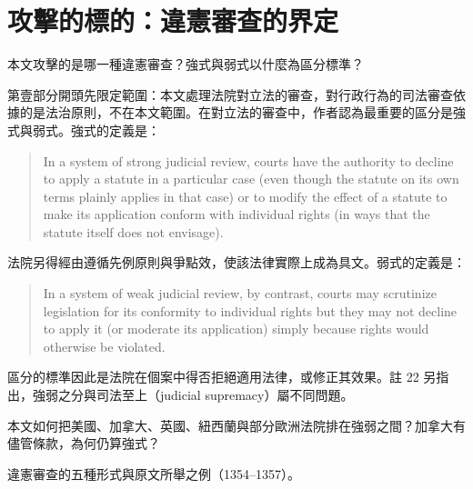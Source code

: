 \chapter{攻擊的標的：違憲審查的界定}


\begin{qaquestion}
本文攻擊的是哪一種違憲審查？強式與弱式以什麼為區分標準？
\end{qaquestion}

第壹部分開頭先限定範圍：本文處理法院對立法的審查，對行政行為的司法審查依據的是法治原則，不在本文範圍。在對立法的審查中，作者認為最重要的區分是強式與弱式。強式的定義是：

\begin{quote}
In a system of strong judicial review, courts have the authority to decline to apply a statute in a particular case (even though the statute on its own terms plainly applies in that case) or to modify the effect of a statute to make its application conform with individual rights (in ways that the statute itself does not envisage).
\end{quote}

法院另得經由遵循先例原則與爭點效，使該法律實際上成為具文。弱式的定義是：

\begin{quote}
In a system of weak judicial review, by contrast, courts may scrutinize legislation for its conformity to individual rights but they may not decline to apply it (or moderate its application) simply because rights would otherwise be violated.
\end{quote}

區分的標準因此是法院在個案中得否拒絕適用法律，或修正其效果。註 22 另指出，強弱之分與司法至上（judicial supremacy）屬不同問題。


\begin{qaquestion}
本文如何把美國、加拿大、英國、紐西蘭與部分歐洲法院排在強弱之間？加拿大有儘管條款，為何仍算強式？
\end{qaquestion}

\begin{qafigure}{違憲審查的五種形式與原文所舉之例（1354--1357）。\label{fig:spectrum}}

\end{qafigure}

